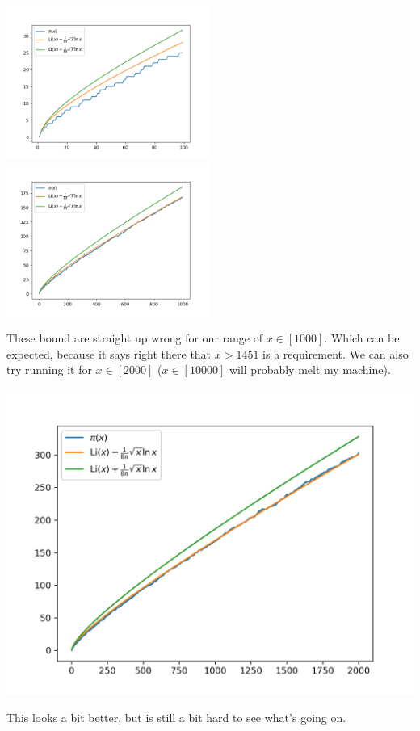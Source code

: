 \documentclass{article}
\begin{document}
  \noindent
  \includegraphics[width=0.5\textwidth]{schoenfeld100}%
  \includegraphics[width=0.5\textwidth]{schoenfeld1000}

  These bound are straight up wrong for our range of $x \in [1000]$.
  Which can be expected, because it says right there that $x > 1451$ is a requirement.
  We can also try running it for $x \in [2000]$ ($x \in [10000]$ will probably melt my machine).

  \noindent
  \includegraphics[width=\textwidth]{schoenfeld2000}

  This looks a bit better, but is still a bit hard to see what's going on.
\end{document}
